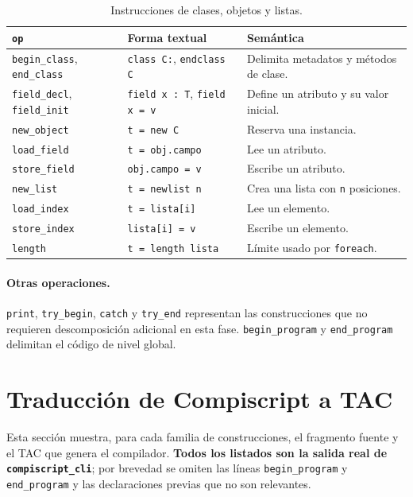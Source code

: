 \documentclass[11pt,a4paper]{article}
\begin{document}
\begin{table}[H]
\centering
\small
\begin{tabular}{@{}L{3.6cm}L{4.2cm}L{6.6cm}@{}}
\toprule
\textbf{\texttt{op}} & \textbf{Forma textual} & \textbf{Semántica} \\
\midrule
\texttt{begin\_class}, \texttt{end\_class} & \texttt{class C:},
\texttt{endclass C} & Delimita metadatos y métodos de clase. \\
\texttt{field\_decl}, \texttt{field\_init} & \texttt{field x : T},
\texttt{field x = v} & Define un atributo y su valor inicial. \\
\texttt{new\_object} & \texttt{t = new C} & Reserva una instancia. \\
\texttt{load\_field} & \texttt{t = obj.campo} & Lee un atributo. \\
\texttt{store\_field} & \texttt{obj.campo = v} & Escribe un atributo. \\
\texttt{new\_list} & \texttt{t = newlist n} & Crea una lista con \texttt{n}
posiciones. \\
\texttt{load\_index} & \texttt{t = lista[i]} & Lee un elemento. \\
\texttt{store\_index} & \texttt{lista[i] = v} & Escribe un elemento. \\
\texttt{length} & \texttt{t = length lista} & Límite usado por \texttt{foreach}. \\
\bottomrule
\end{tabular}
\caption{Instrucciones de clases, objetos y listas.}
\end{table}

\paragraph{Otras operaciones.} \texttt{print}, \texttt{try\_begin},
\texttt{catch} y \texttt{try\_end} representan las construcciones que no
requieren descomposición adicional en esta fase. \texttt{begin\_program} y
\texttt{end\_program} delimitan el código de nivel global.

\section{Traducción de Compiscript a TAC}

Esta sección muestra, para cada familia de construcciones, el fragmento fuente y
el TAC que genera el compilador. \textbf{Todos los listados son la salida real
de \texttt{compiscript\_cli}}; por brevedad se omiten las líneas
\texttt{begin\_program} y \texttt{end\_program} y las declaraciones previas que
no son relevantes.
\end{document}
